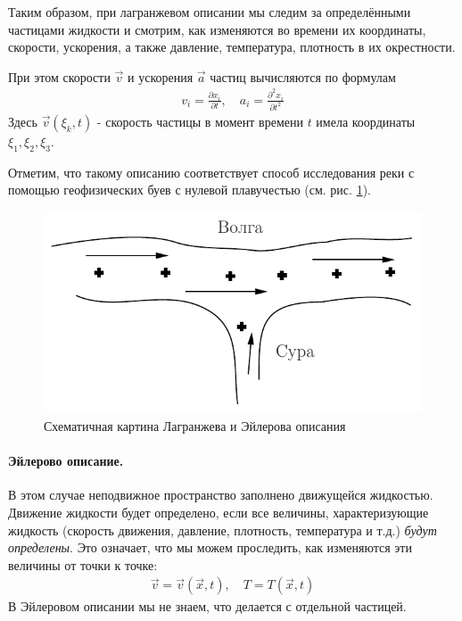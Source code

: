 Таким образом, при лагранжевом описании мы следим за определёнными частицами жидкости и смотрим, как изменяются во времени их координаты,  скорости, ускорения, а также давление, температура, плотность в их окрестности.

При этом скорости $\vec{v}$ и ускорения $\vec{a}$ частиц вычисляются по формулам
\begin{align*}
	v_{i} =\frac{\partial x_{i}}{\partial t}, \quad
	a_{i} =\frac{\partial^{2} x_{i}}{\partial t^{2}} 
\end{align*}
Здесь $ \vec{v}\left(\xi_{k}, t\right) $ - скорость частицы в момент времени $t$ имела координаты $\xi_1,\xi_2,\xi_3$.

Отметим, что такому описанию соответствует способ исследования реки с помощью геофизических буев с нулевой плавучестью (см. рис. \ref{fig:figure3}).
\begin{figure}[H]
	\centering
	\includegraphics[scale=1]{photo/3.pdf}
	\caption{Схематичная картина Лагранжева и Эйлерова описания}%
	\label{fig:figure3}
\end{figure}

\paragraph{Эйлерово описание.} В этом случае неподвижное пространство заполнено движущейся жидкостью. Движение жидкости будет определено, если все величины, характеризующие жидкость (скорость движения, давление, плотность, температура и т.д.) \textit{будут определены}.
Это означает, что мы можем проследить, как изменяются эти величины от точки к точке:
\begin{align*} 
	\vec{v} =\vec{v}(\vec{x}, t), \quad
	T = T(\vec{x}, t)
\end{align*}
В Эйлеровом описании мы не знаем, что делается с отдельной частицей. 

